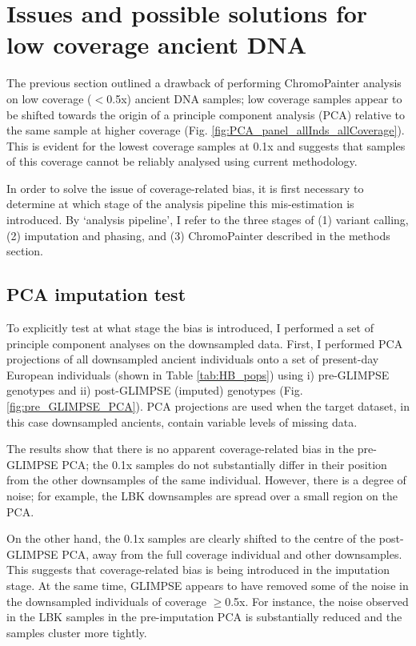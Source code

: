 \section{Issues and possible solutions for low coverage ancient DNA}

The previous section outlined a drawback of performing ChromoPainter analysis on low coverage ($<$0.5x) ancient DNA samples; low coverage samples appear to be shifted towards the origin of a principle component analysis (PCA) relative to the same sample at higher coverage (Fig. \ref{fig:PCA_panel_allInds_allCoverage}). This is evident for the lowest coverage samples at 0.1x and suggests that samples of this coverage cannot be reliably analysed using         current methodology.

In order to solve the issue of coverage-related bias, it is first necessary to determine at which stage of the analysis pipeline this mis-estimation is introduced. By `analysis pipeline', I refer to the three stages of (1) variant calling, (2) imputation and phasing, and (3) ChromoPainter described in the methods section.

\subsection{PCA imputation test}

To explicitly test at what stage the bias is introduced, I performed a set of principle component analyses on the downsampled data. First, I performed PCA projections of all downsampled ancient individuals onto a set of present-day European individuals (shown in Table \ref{tab:HB_pops}) using i) pre-GLIMPSE genotypes and ii) post-GLIMPSE (imputed) genotypes (Fig. \ref{fig:pre_GLIMPSE_PCA}). PCA projections are used when the target dataset, in this case downsampled ancients, contain variable levels of missing data.  

The results show that there is no apparent coverage-related bias in the pre-GLIMPSE PCA; the 0.1x samples do not substantially differ in their position from the other downsamples of the same individual. However, there is a degree of noise; for example, the LBK downsamples are spread over a small region on the PCA. 

On the other hand, the 0.1x samples are clearly shifted to the centre of the post-GLIMPSE PCA, away from the full coverage individual and other downsamples. This suggests that coverage-related bias is being introduced in the imputation stage. At the same time, GLIMPSE appears to have removed some of the noise in the downsampled individuals of coverage $\geq$0.5x. For instance, the noise observed in the LBK samples in the pre-imputation PCA is substantially reduced and the samples cluster more tightly.  

